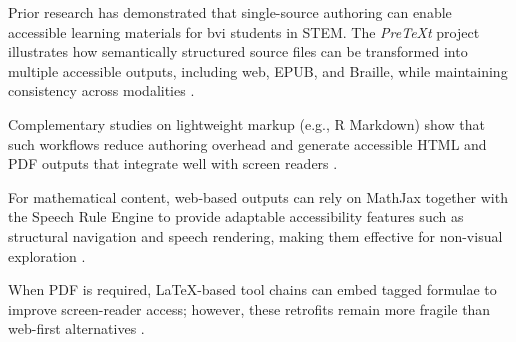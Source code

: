 Prior research has demonstrated that single-source authoring can enable
accessible learning materials for \ac{bvi} students in STEM.
The \emph{PreTeXt} project illustrates how semantically structured source files
can be transformed into multiple accessible outputs, including web, EPUB, and
Braille, while maintaining consistency across modalities
\cite{Austin2024PreTeXt}. 

Complementary studies on lightweight markup (e.g., R
Markdown) show that such workflows reduce authoring overhead and generate
accessible HTML and PDF outputs that integrate well with screen readers
\cite{Seo2019RMarkdown}. 

For mathematical content, web-based outputs can rely
on MathJax together with the Speech Rule Engine to provide adaptable
accessibility features such as structural navigation and speech rendering,
making them effective for non-visual exploration
\cite{CervoneSorge2019W4A}. 

When PDF is required, \LaTeX-based tool chains can
embed tagged formulae to improve screen-reader access; however, these retrofits
remain more fragile than web-first alternatives
\cite{Armano2018LaTeXPDF}.

